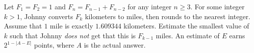 Let $F_1=F_2=1$ and $F_n=F_{n-1}+F_{n-2}$ for any integer $n\geq3$. For some integer $k>1$, Johnny converts $F_k$ kilometers to miles, then rounds to the nearest integer. Assume that $1$ mile is exactly $1.609344$ kilometers. Estimate the smallest value of $k$ such that Johnny \emph{does not} get that this is $F_{k-1}$ miles. An estimate of $E$ earns $2^{1-\left|A-E\right|}$ points, where $A$ is the actual answer.